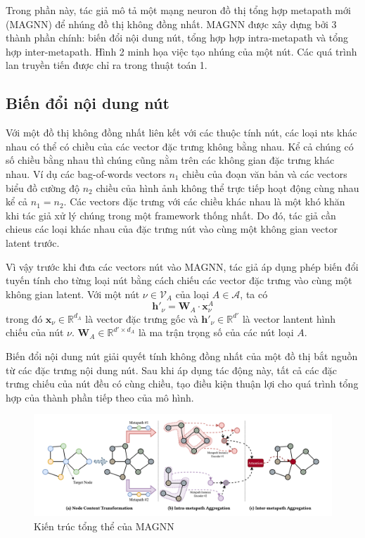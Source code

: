 Trong phần này, tác giả mô tả một mạng neuron đồ thị tổng hợp metapath mới (MAGNN) để nhúng đồ thị không đồng nhất. MAGNN được xây dựng bởi 3 thành phần chính: biến đổi nội dung nút, tổng hợp hợp intra-metapath và tổng hợp inter-metapath. Hình 2 minh họa việc tạo nhúng của một nút. Các quá trình lan truyền tiến được chỉ ra trong thuật toán 1.

\subsection{Biến đổi nội dung nút}
Với một đồ thị không đồng nhất liên kết với các thuộc tính nút, các loại nts khác nhau có thể có chiều của các vector đặc trưng không bằng nhau. Kể cả chúng có số chiều bằng nhau thì chúng cũng nằm trên các không gian đặc trưng khác nhau. Ví dụ các bag-of-words vectors $n_1$ chiều của đoạn văn bản và các vectors biểu đồ cường độ $n_2$ chiều của hình ảnh không thể  trực tiếp hoạt động cùng nhau kể cả $n_1 = n_2$. Các vectors đặc trưng với các chiều khác nhau là một khó khăn khi tác giả xử lý chúng trong một framework thống nhất. Do đó, tác giả cần chieus các loại khác nhau của đặc trưng nút vào cùng một không gian vector latent trước.

Vì vậy trước khi đưa các vectors nút vào MAGNN, tác giả áp dụng phép biến đổi tuyến tính cho từng loại nút bằng cách chiếu các vector đặc trưng vào cùng một không gian latent. Với một nút $\nu \in \pmb{\mathcal{V}}_A$ của loại $A \in \pmb{\mathcal{A}}$, ta có
\begin{equation}
  \mathbf{h'}_{\nu} = \mathbf{W}_A \cdot \mathbf{x}^A_{\nu}
\end{equation}
trong đó $\mathbf{x}_{\nu} \in \mathbb{R}^{d_A}$ là vector đặc trưng gốc và $\mathbf{h'}_{\nu} \in \mathbb{R}^{d'}$ là vector lantent hình chiếu  của nút $\nu$. $\mathbf{W}_A \in \mathbb{R}^{d' \times d_A}$ là ma trận trọng số của các nút loại $A$.

Biến đổi nội dung nút giải quyết tính không đồng nhất của một đồ thị bắt nguồn từ các đặc trưng nội dung nút. Sau khi áp dụng tác động này, tất cả các đặc trưng chiếu của nút đều có cùng chiều, tạo điều kiện thuận lợi cho quá trình tổng hợp của thành phần tiếp theo của mô hình. 

\begin{figure}
  \label{fig:02}
  \includegraphics[width=\textwidth]{figs/fig2.png}
  \caption{Kiến trúc tổng thể của MAGNN}
\end{figure}

